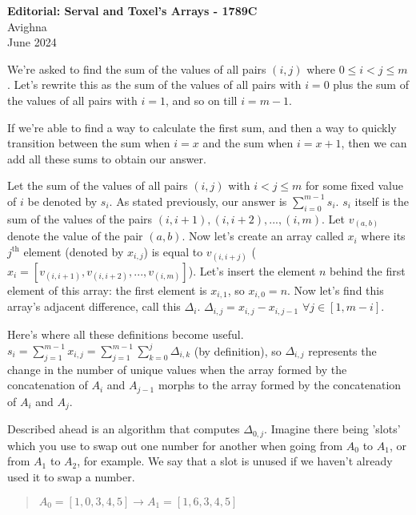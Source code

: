 \documentclass{article}
\begin{document}
\begin{center}
  \large{\textbf{Editorial: Serval and Toxel's Arrays - 1789C}}\\
  \vspace{0.2em}
  \large{Avighna}\\
  \vspace{0.2em}
  \large{June 2024}
\end{center}

We're asked to find the sum of the values of all pairs $(i,j)$ where $0\le i<j\le m$. Let's rewrite this as the sum of the values of all pairs with $i=0$ plus the sum of the values of all pairs with $i=1$, and so on till $i=m-1$.

If we're able to find a way to calculate the first sum, and then a way to quickly transition between the sum when $i=x$ and the sum when $i=x+1$, then we can add all these sums to obtain our answer.

Let the sum of the values of all pairs $(i, j)$ with $i<j \le m$ for some fixed value of $i$ be denoted by $s_i$. As stated previously, our answer is $\displaystyle \sum_{i=0}^{m-1} s_i$. $s_i$ itself is the sum of the values of the pairs $(i, i+1), (i, i+2), ..., (i, m)$. Let $v_{(a,b)}$ denote the value of the pair $(a,b)$. Now let's create an array called $x_i$ where its $j^\text{th}$ element (denoted by $x_{i,j}$) is equal to $v_{(i,i+j)}$ ($x_i = [v_{(i, i+1)}, v_{(i, i+2)}, ..., v_{(i, m)}]$). Let's insert the element $n$ behind the first element of this array: the first element is $x_{i,1}$, so $x_{i,0} = n$. Now let's find this array's adjacent difference, call this $\Delta_i$. $\Delta_{i,j} = x_{i,j}-x_{i,j-1}$ $\forall j \in [1, m-i]$.

Here's where all these definitions become useful. $s_i=\displaystyle \sum_{j=1}^{m-1} x_{i,j} = \sum_{j=1}^{m-1} \sum_{k=0}^{j} \Delta_{i,k}$ (by definition), so $\Delta_{i,j}$ represents the change in the number of unique values when the array formed by the concatenation of $A_i$ and $A_{j-1}$ morphs to the array formed by the concatenation of $A_i$ and $A_j$.

Described ahead is an algorithm that computes $\Delta_{0,j}$. Imagine there being 'slots' which you use to swap out one number for another when going from $A_0$ to $A_1$, or from $A_1$ to $A_2$, for example. We say that a slot is unused if we haven't already used it to swap a number.

\begin{quote}
$A_0 = [1,0,3,4,5] \rightarrow A_1 = [1,6,3,4,5]$
\end{quote}
\end{document}
